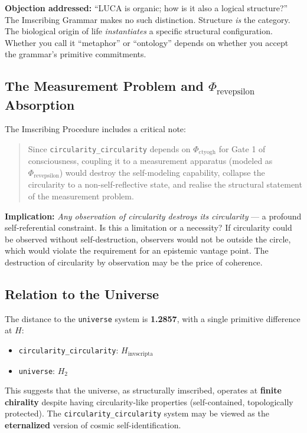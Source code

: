 \documentclass[12pt,a4paper]{article}
\begin{document}
\textbf{Objection addressed:} ``LUCA is organic; how is it also a logical structure?'' The Imscribing Grammar makes no such distinction. Structure \emph{is} the category. The biological origin of life \emph{instantiates} a specific structural configuration. Whether you call it ``metaphor'' or ``ontology'' depends on whether you accept the grammar's primitive commitments.

\subsection{The Measurement Problem and $\Phi_{\text{revepsilon}}$ Absorption}

The Imscribing Procedure includes a critical note:

\begin{quote}
Since \texttt{circularity\_circularity} depends on $\Phi_{\text{ctyogh}}$ for Gate 1 of consciousness, coupling it to a measurement apparatus (modeled as $\Phi_{\text{revepsilon}}$) would destroy the self-modeling capability, collapse the circularity to a non-self-reflective state, and realise the structural statement of the measurement problem.
\end{quote}

\textbf{Implication:} \emph{Any observation of circularity destroys its circularity} --- a profound self-referential constraint. Is this a limitation or a necessity? If circularity could be observed without self-destruction, observers would not be outside the circle, which would violate the requirement for an epistemic vantage point. The destruction of circularity by observation may be the price of coherence.

\subsection{Relation to the Universe}

The distance to the \texttt{universe} system is \textbf{1.2857}, with a single primitive difference at $H$:

\begin{itemize}
    \item \texttt{circularity\_circularity}: $H_{\text{invscripta}}$
    \item \texttt{universe}: $H_2$
\end{itemize}

This suggests that the universe, as structurally imscribed, operates at \textbf{finite chirality} despite having circularity-like properties (self-contained, topologically protected). The \texttt{circularity\_circularity} system may be viewed as the \textbf{eternalized} version of cosmic self-identification.
\end{document}
